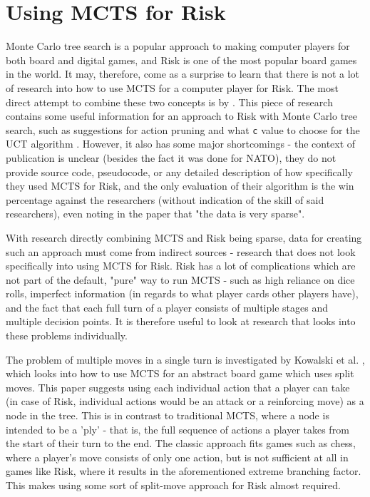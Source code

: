 \section{Using MCTS for Risk}
\label{MCTSforRisk}
Monte Carlo tree search is a popular approach to making computer players for both board and digital games, and Risk is one of the most popular board games in the world. It may, therefore, come as a surprise to learn that there is not a lot of research into how to use MCTS for a computer player for Risk. The most direct attempt to combine these two concepts is by \cite{limer2020monte}. This piece of research contains some useful information for an approach to Risk with Monte Carlo tree search, such as suggestions for action pruning and what \texttt{c} value to choose for the UCT algorithm \cite{kocsis2006bandit}. However, it also has some major shortcomings - the context of publication is unclear (besides the fact it was done for NATO), they do not provide source code, pseudocode, or any detailed description of how specifically they used MCTS for Risk, and the only evaluation of their algorithm is the win percentage against the researchers (without indication of the skill of said researchers), even noting in the paper that "the data is very sparse".

With research directly combining MCTS and Risk being sparse, data for creating such an approach must come from indirect sources - research that does not look specifically into using MCTS for Risk. Risk has a lot of complications which are not part of the default, "pure" way to run MCTS - such as high reliance on dice rolls, imperfect information (in regards to what player cards other players have), and the fact that each full turn of a player consists of multiple stages and multiple decision points. It is therefore useful to look at research that looks into these problems individually.

The problem of multiple moves in a single turn is investigated by Kowalski et al. \cite{kowalski2022split}, which looks into how to use MCTS for an abstract board game which uses split moves. This paper suggests using each individual action that a player can take (in case of Risk, individual actions would be an attack or a reinforcing move) as a node in the tree. This is in contrast to traditional MCTS, where a node is intended to be a 'ply' - that is, the full sequence of actions a player takes from the start of their turn to the end. The classic approach fits games such as chess, where a player's move consists of only one action, but is not sufficient at all in games like Risk, where it results in the aforementioned extreme branching factor. This makes using some sort of split-move approach for Risk almost required.

